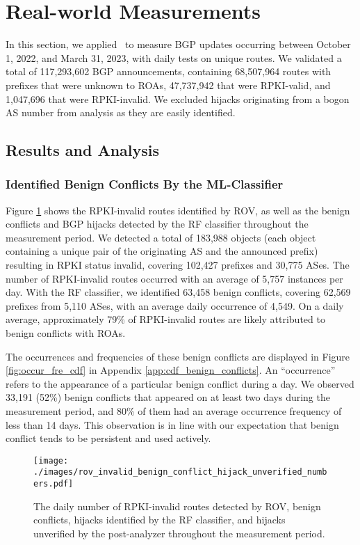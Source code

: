 \vspace{-10pt}
\section{Real-world Measurements} \label{sec:measure}
In this section, we applied \lov\ to measure BGP updates occurring between October 1, 2022, and March 31, 2023, with daily tests on unique routes.
We validated a total of 117,293,602 BGP announcements, containing 68,507,964 routes with prefixes that were unknown to ROAs, 47,737,942 that were RPKI-valid, and 1,047,696 that were RPKI-invalid. We excluded hijacks originating from a bogon AS number from analysis as they are easily identified.



\vspace{-5pt}
\subsection{Results and Analysis}

\subsubsection{Identified Benign Conflicts By the ML-Classifier}
Figure \ref{fig:invalid_bc} shows the RPKI-invalid routes identified by ROV, as well as the benign conflicts and BGP hijacks detected by the RF classifier throughout the measurement period.
We detected a total of 183,988 objects (each object containing a unique pair of the originating AS and the announced prefix) resulting in RPKI status invalid, covering 102,427 prefixes and 30,775 ASes. The number of RPKI-invalid routes occurred with an average of 5,757 instances per day. With the RF classifier, we identified 63,458 benign conflicts, covering 62,569 prefixes from 5,110 ASes, with an average daily occurrence of 4,549.
On a daily average, approximately 79\% of RPKI-invalid routes are likely attributed to benign conflicts with ROAs.

The occurrences and frequencies of these benign conflicts are displayed in Figure \ref{fig:occur_fre_cdf} in Appendix \ref{app:cdf_benign_conflicts}. An ``occurrence'' refers to the appearance of a particular benign conflict during a day. 
 We observed 33,191 (52\%) benign conflicts that appeared on at least two days during the measurement period, and 80\% of them had an average occurrence frequency of less than 14 days.
 This observation is in line with our expectation that benign conflict tends to be persistent and used actively.
 \begin{figure}[t!]
\centerline{\texttt{[image: ./images/rov\_invalid\_benign\_conflict\_hijack\_unverified\_numbers.pdf]}}
\vspace{-15pt}
\caption[The daily number of RPKI-invalid routes, benign conflicts, and hijacks.]{\small{The daily number of RPKI-invalid routes detected by ROV, benign conflicts, hijacks identified by the RF classifier, and hijacks unverified by the post-analyzer throughout the measurement period.}}
\label{fig:invalid_bc}
\end{figure}
\vspace{-5pt}
